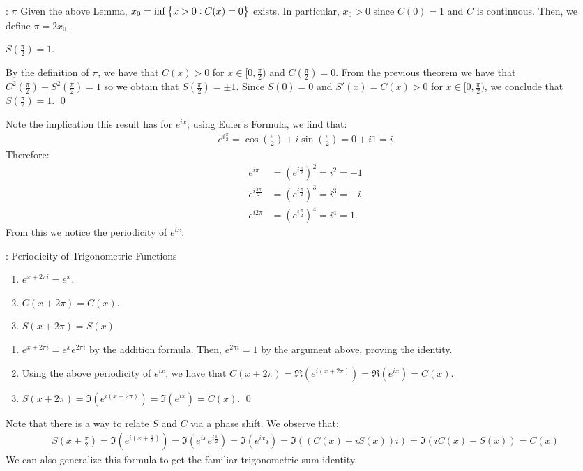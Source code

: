 \begin{ndef}{: $\pi$}{}
    Given the above Lemma, $x_0 = \inf\set{x > 0: C(x) = 0}$ exists. In particular, $x_0 > 0$ since $C(0) = 1$ and $C$ is continuous. Then, we define $\pi = 2x_0$. 
\end{ndef}

\begin{ntheorem}{}{}
    $S(\frac{\pi}{2}) = 1$.
\end{ntheorem}
\begin{nproof}
    By the definition of $\pi$, we have that $C(x) > 0$ for $x \in [0, \frac{\pi}{2})$ and $C(\frac{\pi}{2}) = 0$. From the previous theorem we have that $C^2(\frac{\pi}{2}) + S^2(\frac{\pi}{2}) = 1$ so we obtain that $S(\frac{\pi}{2}) = \pm 1$. Since $S(0) = 0$ and $S'(x) = C(x) > 0$ for $x \in [0, \frac{\pi}{2})$, we conclude that $S(\frac{\pi}{2}) = 1$. \qed
\end{nproof}
\noindent Note the implication this result has for $e^{ix}$; using Euler's Formula, we find that:
\begin{align*}
    e^{i\frac{\pi}{2}} = \cos(\frac{\pi}{2}) + i\sin(\frac{\pi}{2}) = 0 + i1 = i
\end{align*}
Therefore:
\begin{align*}
    e^{i\pi} &= \left(e^{i\frac{\pi}{2}}\right)^2 = i^2 = -1
    \\ e^{i\frac{3\pi}{2}} &= \left(e^{i\frac{\pi}{2}}\right)^3 = i^3 = -i
    \\ e^{i2\pi} &= \left(e^{i\frac{\pi}{2}}\right)^4 = i^4 = 1.
\end{align*}
From this we notice the periodicity of $e^{ix}$. 
\begin{ntheorem}{: Periodicity of Trigonometric Functions}{}
    \begin{enumerate}
        \item $e^{x + 2\pi i} = e^x$.
        \item $C(x + 2\pi) = C(x)$.
        \item $S(x + 2\pi) = S(x)$.
    \end{enumerate}
\end{ntheorem}
\begin{nproof}
    \begin{enumerate}
        \item $e^{x + 2\pi i} = e^{x}e^{2\pi i}$ by the addition formula. Then, $e^{2\pi i} = 1$ by the argument above, proving the identity.
        \item Using the above periodicity of $e^{ix}$, we have that $C(x + 2\pi) = \Re(e^{i(x + 2\pi)}) = \Re(e^{ix}) = C(x)$.
        \item $S(x + 2\pi) = \Im(e^{i(x + 2\pi)}) = \Im(e^{ix}) = C(x)$. \qed
    \end{enumerate}
\end{nproof}
\noindent Note that there is a way to relate $S$ and $C$ via a phase shift. We observe that:
\begin{align*}
    S(x + \frac{\pi}{2}) = \Im(e^{i(x + \frac{\pi}{2})}) = \Im(e^{ix}e^{i\frac{\pi}{2}}) = \Im(e^{ix}i) = \Im((C(x) + iS(x))i) = \Im(iC(x) - S(x)) = C(x)
\end{align*}
\noindent We can also generalize this formula to get the familiar trigonometric sum identity.

